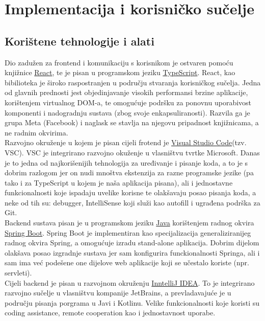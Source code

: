\chapter{Implementacija i korisničko sučelje}
		
		
		\section{Korištene tehnologije i alati}
		
			Dio  zadužen za frontend i komunikaciju s korisnikom je ostvaren pomoću knjižnice \href{https://react.dev/}{React}, te je pisan u programskom jeziku
			\href{https:www.typescriptlang.org/}{TypeScript}. React, kao bibilioteka je široko raspostranjen u području stvaranja korisničkog sučelja. Jedna od glavnih prednosti jest objedinjavanje visokih performansi brzine aplikacije, korištenjem 
virtualnog DOM-a, te omogućuje podršku za ponovnu uporabivost komponenti i nadogradnju sustava (zbog svoje enkapsuliranosti). Razvila ga je grupa Meta (Facebook) i naglask se stavlja na njegovu pripadnost knjižnicama, a ne radnim okvirima. \\
			Razvojno okruženje u kojem je pisan cijeli frotend je \href{https://code.visualstudio.com/}{Visual Studio Code}(tzv. VSC). VSC je integrirano razvojno okuženje u vlasništvu tvrtke Microsoft. Danas je to jedna od najkorišenijih tehnologija za uređivanje i pisanje koda, a to je s dobrim razlogom jer on nudi mnoštva ekstenzija za razne programske jezike (pa tako i za TypeScript u kojem je naša aplikacija pisana), ali i jednostavne funkcionalnosti koje ispadaju uvelike korisne te olakšavaju posao pisanja koda, a neke od tih su: debugger, IntelliSense koji služi kao autofill i ugrađena podrška za Git. \\
			Backend sustava pisan je u programskom jeziku \href{https://www.java.com/en/}{Java} korištenjem radnog okvira \href{https://spring.io/projects/spring-boot/}{Spring Boot}. Spring Boot je implementiran kao specijalizacija generaliziranijeg radnog okvira Spring, a omogućuje izradu stand-alone aplikacija. Dobrim dijelom olakšava posao izgradnje sustava jer sam konfigurira funckionalnosti Springa, ali i sam ima već podešene one dijelove web aplikacije koji se učestalo koriste (npr. servleti).\\
			Cijeli backend je pisan u razvojnom okruženju \href{https://www.jetbrains.com/idea/}{InntelliJ IDEA}. To je integrirano razvojno sučelje u vlasništvu kompanije JetBrains, a prevladavajuće je u području pisanja porgrama u Javi i Kotlinu. Velike funkcionalnosti koje koristi su coding assistance, remote cooperation kao i jednostavnost uporabe. \\

